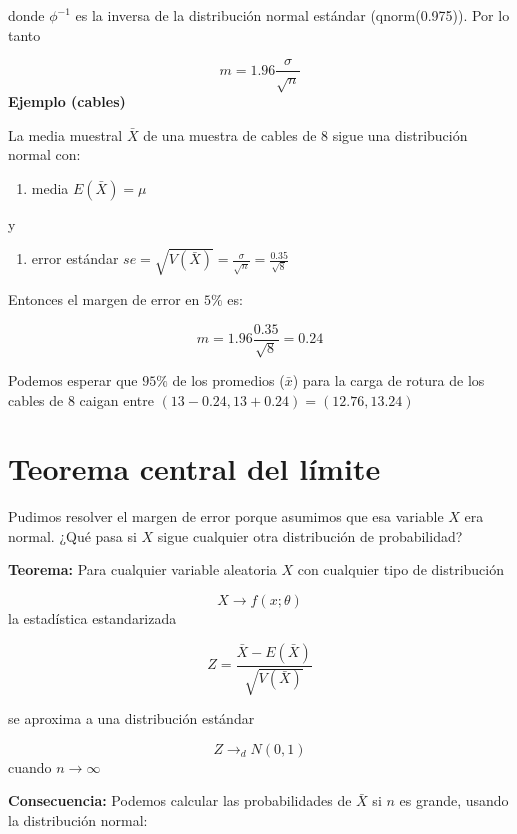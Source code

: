 \documentclass[
]{book}
\providecommand{\tightlist}{%
  \setlength{\itemsep}{0pt}\setlength{\parskip}{0pt}}
\begin{document}
donde \(\phi^{-1}\) es la inversa de la distribución normal estándar (qnorm(0.975)). Por lo tanto

\[m=1.96 \frac{\sigma}{\sqrt{n}}\]
\textbf{Ejemplo (cables)}

La media muestral \(\bar{X}\) de una muestra de cables de \(8\) sigue una distribución normal con:

\begin{enumerate}
\def\labelenumi{\arabic{enumi}.}
\tightlist
\item
  media \(E(\bar{X})=\mu\)
\end{enumerate}

y

\begin{enumerate}
\def\labelenumi{\arabic{enumi}.}
\setcounter{enumi}{1}
\tightlist
\item
  error estándar \(se=\sqrt{V(\bar{X})}=\frac{\sigma}{\sqrt{n}}=\frac{0.35}{\sqrt{8}}\)
\end{enumerate}

Entonces el margen de error en \(5\%\) es:

\[m=1.96\frac{0.35}{\sqrt{8}}=0.24\]

Podemos esperar que \(95\%\) de los promedios (\(\bar{x}\)) para la carga de rotura de los cables de \(8\) caigan entre \((13-0.24, 13+0.24)=(12.76, 13.24)\)

\hypertarget{teorema-central-del-luxedmite-1}{%
\section{Teorema central del límite}\label{teorema-central-del-luxedmite-1}}

Pudimos resolver el margen de error porque asumimos que esa variable \(X\) era normal. ¿Qué pasa si \(X\) sigue cualquier otra distribución de probabilidad?

\textbf{Teorema:} Para cualquier variable aleatoria \(X\) con cualquier tipo de distribución

\[X \rightarrow f(x; \theta)\]
la estadística estandarizada

\[Z=\frac{\bar{X}-E(\bar{X})}{\sqrt{V(\bar{X})}}\]

se aproxima a una distribución estándar

\[Z \rightarrow_d N(0,1)\] cuando \(n\rightarrow \infty\)

\textbf{Consecuencia:} Podemos calcular las probabilidades de \(\bar{X}\) si \(n\) es grande, usando la distribución normal:
\end{document}

